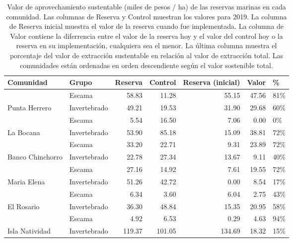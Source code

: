 \begin{table}

\caption{\label{tab:sust_val}Valor de aprovechamiento sustentable (miles de pesos / ha) de las reservas marinas en cada comunidad. Las columnas de Reserva y Control muestran los valores para 2019. La columna de Reserva inicial muestra el valor de la reserva cuando fue implementada. La columna de Valor contiene la diferrencia entre el valor de la reserva hoy y el valor del control hoy o la reserva en su implementación, cualquiera sea el menor. La última columna muestra el porcentaje del valor de extracción sustentable en relación al valor de extracción total. Las comunidades están ordenadas en orden descendiente según el valor sostenible total.}
\centering
\begin{tabular}[t]{llrrrrl}
\toprule
Comunidad & Grupo & Reserva & Control & Reserva (inicial) & Valor & \%\\
\midrule
 & Escama & 58.83 & 11.28 & 55.15 & 47.56 & 81\%\\
\cmidrule{2-7}
\multirow{-2}{*}{\raggedright\arraybackslash Punta Herrero} & Invertebrado & 49.21 & 19.53 & 31.90 & 29.68 & 60\%\\
\cmidrule{1-7}
 & Escama & 5.54 & 16.50 & 7.06 & 0.00 & 0\%\\
\cmidrule{2-7}
\multirow{-2}{*}{\raggedright\arraybackslash La Bocana} & Invertebrado & 53.90 & 85.18 & 15.09 & 38.81 & 72\%\\
\cmidrule{1-7}
 & Escama & 33.20 & 22.71 & 9.31 & 23.89 & 72\%\\
\cmidrule{2-7}
\multirow{-2}{*}{\raggedright\arraybackslash Banco Chinchorro} & Invertebrado & 22.78 & 27.34 & 13.67 & 9.11 & 40\%\\
\cmidrule{1-7}
 & Escama & 27.16 & 14.92 & 7.61 & 19.55 & 72\%\\
\cmidrule{2-7}
\multirow{-2}{*}{\raggedright\arraybackslash Maria Elena} & Invertebrado & 51.26 & 42.72 & 0.00 & 8.54 & 17\%\\
\cmidrule{1-7}
 & Escama & 6.34 & 3.60 & 6.04 & 2.75 & 43\%\\
\cmidrule{2-7}
\multirow{-2}{*}{\raggedright\arraybackslash El Rosario} & Invertebrado & 36.30 & 48.84 & 15.35 & 20.95 & 58\%\\
\cmidrule{1-7}
 & Escama & 4.92 & 6.53 & 0.29 & 4.63 & 94\%\\
\cmidrule{2-7}
\multirow{-2}{*}{\raggedright\arraybackslash Isla Natividad} & Invertebrado & 119.37 & 101.05 & 134.69 & 18.32 & 15\%\\
\cmidrule{1-7}

\end{tabular}
\end{table}
